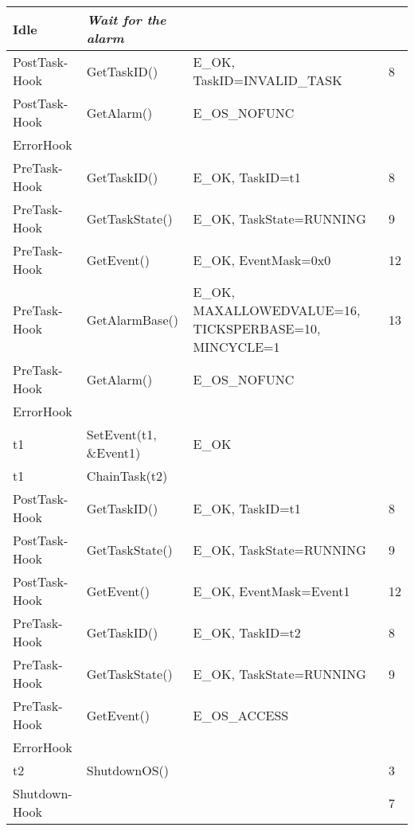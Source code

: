 \documentclass[10pt]{article}
\newlength{\Li}\settowidth{\Li}{Running}
\newlength{\Lii}\setlength{\Lii}{7cm}
\newlength{\Liiii}\setlength{\Liiii}{0.9cm}
\newlength{\Liii}\setlength{\Liii}{\textwidth} \addtolength{\Liii}{-\Li} \addtolength{\Liii}{-\Lii} \addtolength{\Liii}{-\Liiii}
\begin{document}
\begin{supertabular}{|p{\Li}|p{\Lii}|p{\Liii}|p{\Liiii}|}
	Idle				& \textit{Wait for the alarm}					&								&\\ \hline
	
	PostTask-Hook		& GetTaskID()						& E\_OK, TaskID=INVALID\_TASK		& 8 \\ \hline	
	PostTask-Hook		& GetAlarm()						& E\_OS\_NOFUNC					& \\ \hline	
	ErrorHook			& 								& 								& \\ \hline
	
	PreTask-Hook		& GetTaskID()						& E\_OK, TaskID=t1				& 8 \\ \hline	
	PreTask-Hook		& GetTaskState()					& E\_OK, TaskState=RUNNING		& 9 \\ \hline	
	PreTask-Hook		& GetEvent()						& E\_OK, EventMask=0x0				& 12 \\ \hline	
	PreTask-Hook		& GetAlarmBase()					& E\_OK, MAXALLOWEDVALUE=16, TICKSPERBASE=10, MINCYCLE=1							& 13 \\ \hline
	PreTask-Hook		& GetAlarm()						& E\_OS\_NOFUNC					& \\ \hline	
	ErrorHook			& 								& 								& \\ \hline
	
	t1				& SetEvent(t1, \&Event1)				& E\_OK							& \\ \hline
	t1				& ChainTask(t2)					& 								& \\ \hline
	
	PostTask-Hook		& GetTaskID()						& E\_OK, TaskID=t1				& 8 \\ \hline	
	PostTask-Hook		& GetTaskState()					& E\_OK, TaskState=RUNNING  		& 9 \\ \hline	
	PostTask-Hook		& GetEvent()						& E\_OK, EventMask=Event1			& 12 \\ \hline	
	
	PreTask-Hook		& GetTaskID()						& E\_OK, TaskID=t2				& 8 \\ \hline	
	PreTask-Hook		& GetTaskState()					& E\_OK, TaskState=RUNNING		& 9 \\ \hline	
	PreTask-Hook		& GetEvent()						& E\_OS\_ACCESS					& \\ \hline	
	ErrorHook			& 								& 								& \\ \hline
	
	t2			& ShutdownOS()						& 								& 3 \\ \hline
	
	Shutdown-Hook	& 								& 								& 7 \\ \hline	
	\end{supertabular}\\
	
\end{document}
